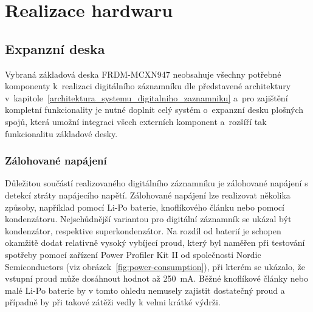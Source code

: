 




\chapter{Realizace hardwaru}
\label{realizace_hardwaru}

\section{Expanzní deska}
\label{expanzni_deska}
Vybraná základová deska FRDM-MCXN947 neobsahuje všechny potřebné komponenty k~realizaci digitálního záznamníku dle představené architektury v~kapitole~\ref{architektura_systemu_digitalniho_zaznamniku} a~pro zajištění kompletní funkcionality je nutné doplnit celý systém o~expanzní desku plošných spojů, která umožní integraci všech externích komponent a~rozšíří tak funkcionalitu základové desky.

\subsection{Zálohované napájení}
\label{zalohovane_napajeni_hw}
Důležitou součástí realizovaného digitálního záznamníku je zálohované napájení s detekcí ztráty napájecího napětí. Zálohované napájení lze realizovat několika způsoby, například pomocí Li-Po baterie, knoflíkového článku nebo pomocí kondenzátoru. Nejschůdnější variantou pro digitální záznamník se ukázal být kondenzátor, respektive superkondenzátor. Na rozdíl od baterií je schopen okamžitě dodat relativně vysoký vybíjecí proud, který byl naměřen při testování spotřeby pomocí zařízení Power Profiler Kit II od společnosti Nordic Semiconductors (viz obrázek~\ref{fig:power-consumption}), při kterém se ukázalo, že vstupní proud může dosáhnout hodnot až \SI{250}{\milli\ampere}. Běžné knoflíkové články nebo malé Li-Po baterie by v tomto ohledu nemusely zajistit dostatečný proud a případně by při takové zátěži vedly k velmi krátké výdrži.~\cite{nordic_semi_ppk2}

